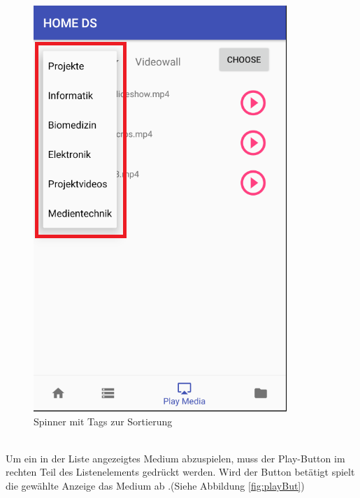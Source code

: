 \begin{figure}[H]
\centering
\includegraphics[scale=0.35]{images/06_AndroidApp/06_TagChoice}
\caption{Spinner mit Tags zur Sortierung}
\label{fig:spinner}
\end{figure}
\\
Um ein in der Liste angezeigtes Medium abzuspielen, muss der Play-Button im rechten Teil des Listenelements gedrückt werden. Wird der Button betätigt spielt die gewählte Anzeige das Medium ab .(Siehe Abbildung \ref{fig:playBut})
